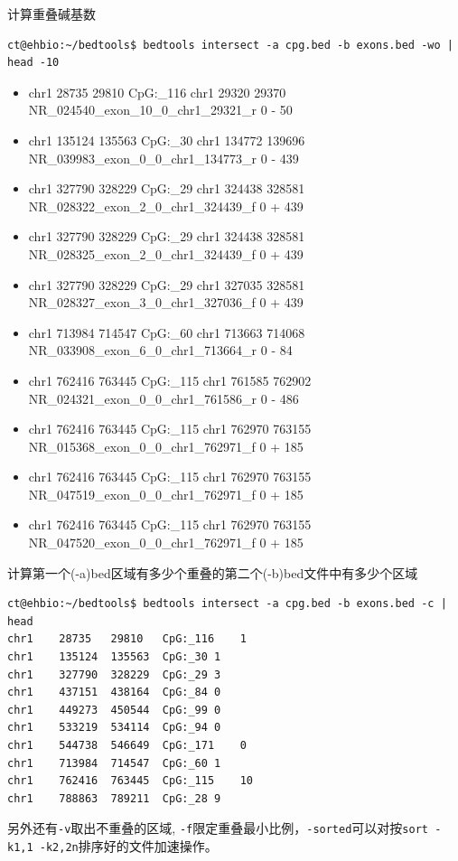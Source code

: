 \documentclass[]{article}
\providecommand{\tightlist}{%
  \setlength{\itemsep}{0pt}\setlength{\parskip}{0pt}}
\numberwithin{figure}{section}
\numberwithin{table}{section}
\begin{document}
计算重叠碱基数

\begin{verbatim}
ct@ehbio:~/bedtools$ bedtools intersect -a cpg.bed -b exons.bed -wo | head -10
\end{verbatim}

\begin{itemize}
\tightlist
\item
  chr1 28735 29810 CpG:\_116 chr1 29320 29370 NR\_024540\_exon\_10\_0\_chr1\_29321\_r 0 - 50
\item
  chr1 135124 135563 CpG:\_30 chr1 134772 139696 NR\_039983\_exon\_0\_0\_chr1\_134773\_r 0 - 439
\item
  chr1 327790 328229 CpG:\_29 chr1 324438 328581 NR\_028322\_exon\_2\_0\_chr1\_324439\_f 0 + 439
\item
  chr1 327790 328229 CpG:\_29 chr1 324438 328581 NR\_028325\_exon\_2\_0\_chr1\_324439\_f 0 + 439
\item
  chr1 327790 328229 CpG:\_29 chr1 327035 328581 NR\_028327\_exon\_3\_0\_chr1\_327036\_f 0 + 439
\item
  chr1 713984 714547 CpG:\_60 chr1 713663 714068 NR\_033908\_exon\_6\_0\_chr1\_713664\_r 0 - 84
\item
  chr1 762416 763445 CpG:\_115 chr1 761585 762902 NR\_024321\_exon\_0\_0\_chr1\_761586\_r 0 - 486
\item
  chr1 762416 763445 CpG:\_115 chr1 762970 763155 NR\_015368\_exon\_0\_0\_chr1\_762971\_f 0 + 185
\item
  chr1 762416 763445 CpG:\_115 chr1 762970 763155 NR\_047519\_exon\_0\_0\_chr1\_762971\_f 0 + 185
\item
  chr1 762416 763445 CpG:\_115 chr1 762970 763155 NR\_047520\_exon\_0\_0\_chr1\_762971\_f 0 + 185
\end{itemize}

计算第一个(-a)bed区域有多少个重叠的第二个(-b)bed文件中有多少个区域

\begin{verbatim}
ct@ehbio:~/bedtools$ bedtools intersect -a cpg.bed -b exons.bed -c | head
chr1	28735	29810	CpG:_116	1
chr1	135124	135563	CpG:_30	1
chr1	327790	328229	CpG:_29	3
chr1	437151	438164	CpG:_84	0
chr1	449273	450544	CpG:_99	0
chr1	533219	534114	CpG:_94	0
chr1	544738	546649	CpG:_171	0
chr1	713984	714547	CpG:_60	1
chr1	762416	763445	CpG:_115	10
chr1	788863	789211	CpG:_28	9
\end{verbatim}

另外还有\texttt{-v}取出不重叠的区域, \texttt{-f}限定重叠最小比例，\texttt{-sorted}可以对按\texttt{sort\ -k1,1\ -k2,2n}排序好的文件加速操作。
\end{document}
